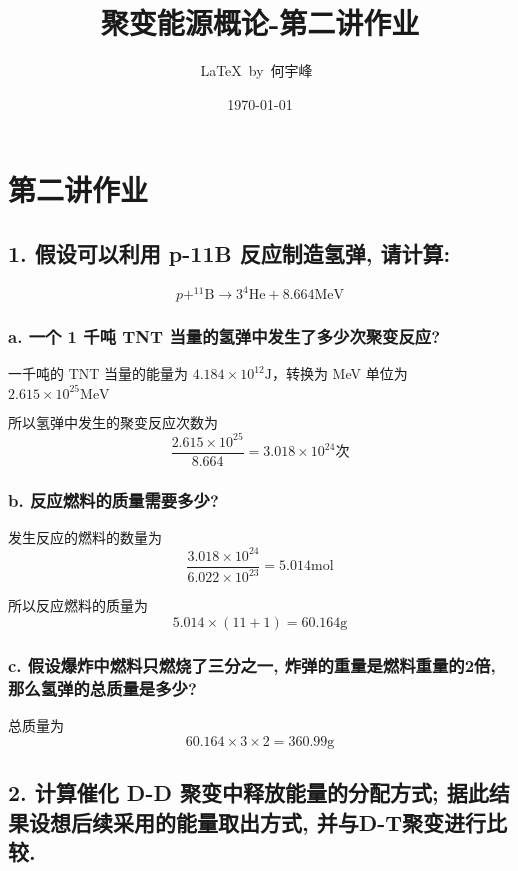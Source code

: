 \documentclass{article}
\title{聚变能源概论-第二讲作业}
\author{\LaTeX\ by\ 何宇峰\ }
\date{\today}
\begin{document}
\pagestyle{fancy}

\fancyhead[R]{\today}

\section*{第二讲作业}

\subsection*{1. 假设可以利用 p-11B 反应制造氢弹, 请计算: }

$$ p + ^{11}\text{B} \rightarrow 3 ^{4}\text{He} + 8.664 \text{MeV}$$

\subsubsection*{a. 一个 1 千吨 TNT 当量的氢弹中发生了多少次聚变反应? }

一千吨的 TNT 当量的能量为 $4.184 \times {10}^{12} \text{J}$\cite{TNT-equivalent}，转换为 MeV 单位为 $2.615 \times {10}^{25} \text{MeV}$

所以氢弹中发生的聚变反应次数为 $$\frac{2.615 \times {10}^{25}}{8.664} = 3.018 \times {10}^{24} \text{次}$$

\subsubsection*{b. 反应燃料的质量需要多少? }

发生反应的燃料的数量为 $$\frac{3.018 \times {10}^{24}}{6.022 \times {10}^{23}} = 5.014 \text{mol}$$

所以反应燃料的质量为 $$5.014 \times (11+1) = 60.164 \text{g}$$

\subsubsection*{c. 假设爆炸中燃料只燃烧了三分之一, 炸弹的重量是燃料重量的2倍, 那么氢弹的总质量是多少? }

总质量为 $$60.164 \times 3 \times 2 = 360.99 \text{g}$$

\subsection*{2. 计算催化 D-D 聚变中释放能量的分配方式; 据此结果设想后续采用的能量取出方式, 并与D-T聚变进行比较. }
\end{document}
